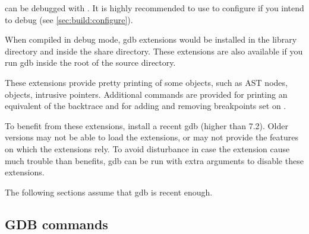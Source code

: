\urbi can be debugged with .  It is highly recommended to use
 to configure if you intend to
debug (see \autoref{sec:build:configure}).

When compiled in debug mode, gdb extensions would be installed in the
library directory and inside the share directory.  These extensions are also
available if you run gdb inside the root of the source directory.

These extensions provide pretty printing of some \Cxx objects, such as AST
nodes, \urbi objects, intrusive pointers.  Additional commands are provided
for printing an equivalent of the \us backtrace and for adding and removing
breakpoints set on \us.

To benefit from these extensions, install a recent gdb (higher than 7.2).
Older versions may not be able to load the extensions, or may not provide
the features on which the extensions rely.  To avoid disturbance in case the
extension cause much trouble than benefits, gdb can be run with extra
arguments to disable these extensions.


The following sections assume that gdb is recent enough.

\subsection{GDB commands}

